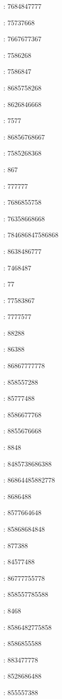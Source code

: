 : 7684847777\par
{}: 75737668\par
{}: 7667677367\par
{}: 7586268\par
{}: 7586847\par
{}: 8685758268\par
{}: 8626846668\par
{}: 7577\par
{}: 86856768667\par
{}: 7585268368\par
{}: 867\par
{}: 777777\par
{}: 7686855758\par
{}: 76358668668\par
{}: 784686847586868\par
{}: 8638486777\par
{}: 7468487\par
{}: 77\par
{}: 77583867\par
{}: 7777577\par
{}: 88288\par
{}: 86388\par
{}: 86867777778\par
{}: 858557288\par
{}: 85777488\par
{}: 8586677768\par
{}: 8855676668\par
{}: 8848\par
{}: 8485738686388\par
{}: 86864485882778\par
{}: 8686488\par
{}: 8577664648\par
{}: 85868684848\par
{}: 877388\par
{}: 84577488\par
{}: 86777755778\par
{}: 858557785588\par
{}: 8468\par
{}: 8586482775858\par
{}: 8586855588\par
{}: 883477778\par
{}: 8528686488\par
{}: 855557388\par
